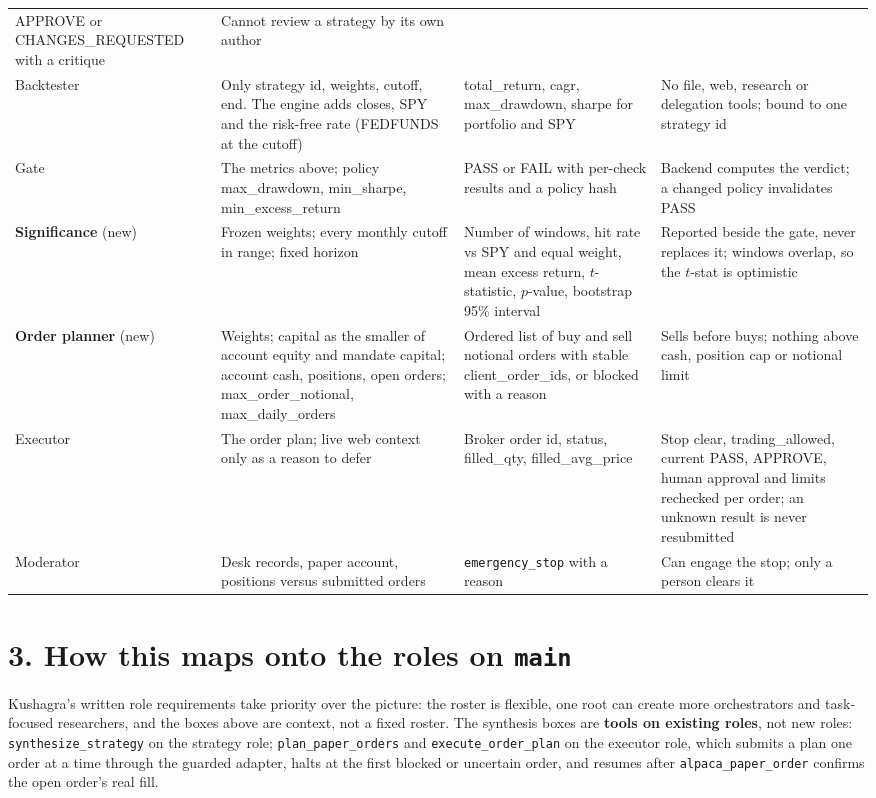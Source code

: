 \documentclass[11pt,a4paper]{article}
\begin{document}
\begin{longtable}{@{}R{2.2cm}R{4.4cm}R{4.4cm}R{4.2cm}@{}}
APPROVE or CHANGES\_REQUESTED with a critique &
Cannot review a strategy by its own author \\
\addlinespace
Backtester &
Only strategy id, weights, cutoff, end. The engine adds closes, SPY and the risk-free rate (FEDFUNDS at the cutoff) &
total\_return, cagr, max\_drawdown, sharpe for portfolio and SPY &
No file, web, research or delegation tools; bound to one strategy id \\
\addlinespace
Gate &
The metrics above; policy max\_drawdown, min\_sharpe, min\_excess\_return &
PASS or FAIL with per-check results and a policy hash &
Backend computes the verdict; a changed policy invalidates PASS \\
\addlinespace
\textbf{Significance} (new) &
Frozen weights; every monthly cutoff in range; fixed horizon &
Number of windows, hit rate vs SPY and equal weight, mean excess return, $t$-statistic, $p$-value, bootstrap 95\% interval &
Reported beside the gate, never replaces it; windows overlap, so the $t$-stat is optimistic \\
\addlinespace
\textbf{Order planner} (new) &
Weights; capital as the smaller of account equity and mandate capital; account cash, positions, open orders; max\_order\_notional, max\_daily\_orders &
Ordered list of buy and sell notional orders with stable client\_order\_ids, or blocked with a reason &
Sells before buys; nothing above cash, position cap or notional limit \\
\addlinespace
Executor &
The order plan; live web context only as a reason to defer &
Broker order id, status, filled\_qty, filled\_avg\_price &
Stop clear, trading\_allowed, current PASS, APPROVE, human approval and limits rechecked per order; an unknown result is never resubmitted \\
\addlinespace
Moderator &
Desk records, paper account, positions versus submitted orders &
\texttt{emergency\_stop} with a reason &
Can engage the stop; only a person clears it \\
\end{longtable}
\normalsize

\section*{3. How this maps onto the roles on \texttt{main}}

Kushagra's written role requirements take priority over the picture: the roster is flexible, one root can create more orchestrators and task-focused researchers, and the boxes above are context, not a fixed roster. The synthesis boxes are \textbf{tools on existing roles}, not new roles: \texttt{synthesize\_strategy} on the strategy role; \texttt{plan\_paper\_orders} and \texttt{execute\_order\_plan} on the executor role, which submits a plan one order at a time through the guarded adapter, halts at the first blocked or uncertain order, and resumes after \texttt{alpaca\_paper\_order} confirms the open order's real fill.
\end{document}
